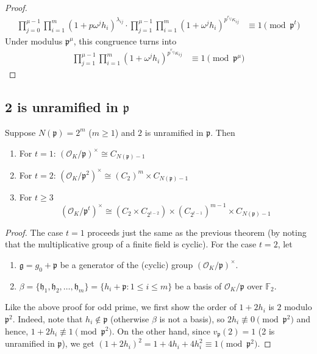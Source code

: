 \documentclass{treatise}
\begin{document}
\begin{shaded}
\begin{proof}
\begin{align*}
\prod_{j = 0}^{\mu-1} \prod_{i = 1}^m (1 + p \omega^j h_i)^{\lambda_{ij}} \cdot \prod_{j = 1}^{\mu-1} \prod_{i = 1}^m (1 + \omega^j h_i)^{p^{r_{ij}} \kappa_{ij}} & \equiv 1 \pmod{\mathfrak{p}^t}
\end{align*}
Under modulus $\mathfrak{p}^\mu$, this congruence turns into
\begin{align*}
\prod_{j = 1}^{\mu-1} \prod_{i = 1}^m (1 + \omega^j h_i)^{p^{r_{ij}} \kappa_{ij}} & \equiv 1 \pmod{\mathfrak{p}^\mu}
\end{align*}

\end{proof}

\subsection{2 is unramified in $\mathfrak{p}$}
\begin{theorem}
Suppose $N(\mathfrak{p}) = 2^m$ ($m \geq 1$) and $2$ is unramified in $\mathfrak{p}$. Then
\begin{enumerate}
	\item For $t = 1$: $(\mathcal{O}_K / \mathfrak{p})^\times \cong C_{N(\mathfrak{p}) - 1}$
	\item For $t = 2$: $(\mathcal{O}_K / \mathfrak{p}^2)^\times \cong (C_2)^m \times C_{N(\mathfrak{p}) - 1}$
	\item For $t \geq 3$
	$$(\mathcal{O}_K / \mathfrak{p}^t)^\times \cong (C_2 \times C_{2^{t - 2}}) \times (C_{2^{t - 1}})^{m - 1} \times C_{N(\mathfrak{p}) - 1}$$
\end{enumerate}
\end{theorem}
\begin{proof}
The case $t = 1$ proceeds just the same as the previous theorem (by noting that the multiplicative group of a finite field is cyclic). For the case $t = 2$, let
\begin{enumerate}
	\item $\mathfrak{g} = g_0 + \mathfrak{p}$ be a generator of the (cyclic) group $(\mathcal{O}_K / \mathfrak{p})^\times$.
	\item $\beta = \{ \mathfrak{h}_1, \mathfrak{h}_2, \hdots, \mathfrak{h}_m \} = \{ h_i + \mathfrak{p} : 1 \leq i \leq m \}$ be a basis of $\mathcal{O}_K/\mathfrak{p}$ over $\mathbb{F}_2$.
\end{enumerate}
Like the above proof for odd prime, we first show the order of $1 + 2 h_i$ is $2$ modulo $\mathfrak{p}^2$. Indeed, note that $h_i \notin \mathfrak{p}$ (otherwise $\beta$ is not a basis), so $2 h_i \not\equiv 0 \pmod{\mathfrak{p}^2}$ and hence, $1 + 2h_i \not\equiv 1 \pmod{\mathfrak{p}^2}$. On the other hand, since $v_\mathfrak{p}(2) = 1$ (2 is unramified in $\mathfrak{p}$), we get $(1 + 2h_i)^2 = 1 + 4 h_i + 4 h_i^2 \equiv 1 \pmod{\mathfrak{p}^2}$.

\end{proof}
\end{shaded}
\end{document}
